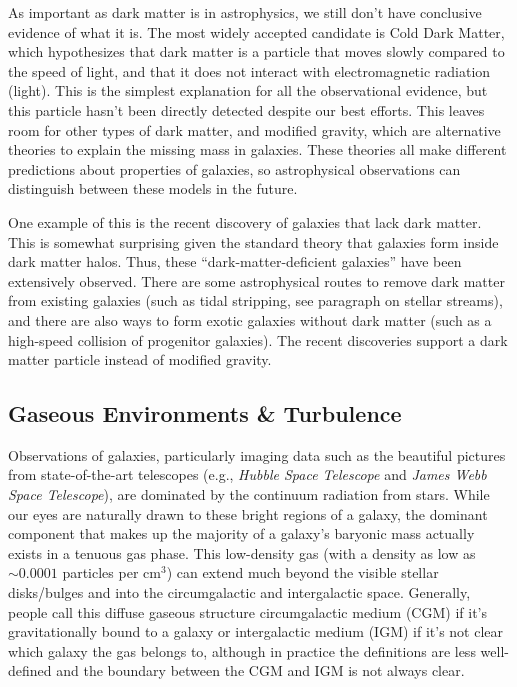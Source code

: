 As important as dark matter is in astrophysics, we still don’t have conclusive evidence of what it is. The most widely accepted candidate is Cold Dark Matter, which hypothesizes that dark matter is a particle that moves slowly compared to the speed of light, and that it does not interact with electromagnetic radiation (light). This is the simplest explanation for all the observational evidence, but this particle hasn’t been directly detected despite our best efforts. This leaves room for other types of dark matter, and modified gravity, which are alternative theories to explain the missing mass in galaxies. These theories all make different predictions about properties of galaxies, so astrophysical observations can distinguish between these models in the future.

One example of this is the recent discovery of galaxies that lack dark matter. This is somewhat surprising given the standard theory that galaxies form inside dark matter halos. Thus, these “dark-matter-deficient galaxies” have been extensively observed. There are some astrophysical routes to remove dark matter from existing galaxies (such as tidal stripping, see paragraph on stellar streams), and there are also ways to form exotic galaxies without dark matter (such as a high-speed collision of progenitor galaxies). The recent discoveries support a dark matter particle instead of modified gravity.


\subsection{Gaseous Environments \& Turbulence}
Observations of galaxies, particularly imaging data such as the beautiful pictures from state-of-the-art telescopes (e.g., {\it Hubble Space Telescope} and {\it James Webb Space Telescope}), are dominated by the continuum radiation from stars. While our eyes are naturally drawn to these bright regions of a galaxy, the dominant component that makes up the majority of a galaxy's baryonic mass actually exists in a tenuous gas phase. This low-density gas (with a density as low as $\sim0.0001$ particles per cm$^3$) can extend much beyond the visible stellar disks/bulges and into the circumgalactic and intergalactic space. Generally, people call this diffuse gaseous structure circumgalactic medium (CGM) if it's gravitationally bound to a galaxy or intergalactic medium (IGM) if it's not clear which galaxy the gas belongs to, although in practice the definitions are less well-defined and the boundary between the CGM and IGM is not always clear. 

